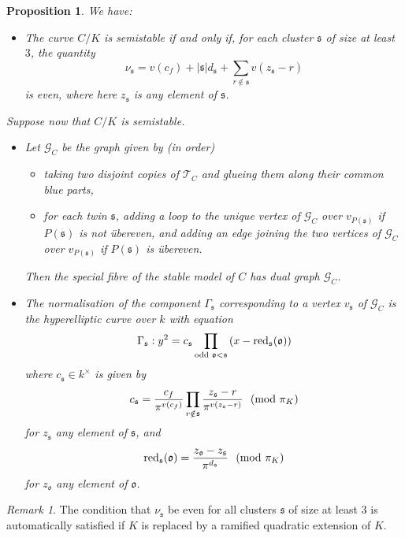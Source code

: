 \documentclass[12pt]{amsart}
\numberwithin{equation}{section}
\newtheorem{proposition}[equation]{Proposition}
\theoremstyle{remark}
\newtheorem{remark}[equation]{Remark}
\theoremstyle{definition}
\theoremstyle{definition}
\theoremstyle{definition}
\theoremstyle{definition}
\theoremstyle{definition}
\theoremstyle{definition}
\begin{document}
\begin{proposition} \label{m2d2}
We have:
\begin{itemize}
\item[(i)] The curve $C/K$ is semistable if and only if, for each cluster $\mathfrak{s}$ of size at least $3$, the quantity
\[\nu_{\mathfrak{s}}=v(c_f)+|\mathfrak{s}|d_{\mathfrak{s}}+\sum_{r\notin \mathfrak{s}}v(z_{\mathfrak{s}}-r)\]
is even, where here $z_{\mathfrak{s}}$ is any element of $\mathfrak{s}$.
\end{itemize}
 Suppose now that $C/K$ is semistable.
 \begin{itemize}
\item[(ii)] Let $\mathcal{G}_C$ be the graph given by (in order)
\begin{itemize}
\item taking two disjoint copies of $\mathcal{T}_C$ and glueing them along their common blue parts,
\item for each twin $\mathfrak{s}$, adding a loop to the unique vertex of $\mathcal{G}_C$ over $v_{P(\mathfrak{s})}$ if $P(\mathfrak{s})$ is not   \"{u}bereven, and adding an edge joining the two vertices of $\mathcal{G}_C$ over $v_{P(\mathfrak{s})}$ if $P(\mathfrak{s})$ is \"{u}bereven. 
\end{itemize}
Then the special fibre of the stable model of $C$ has dual graph $\mathcal{G}_C$. 
\item[(iii)] The normalisation of the component $\Gamma_{\mathfrak{s}}$ corresponding to a vertex $v_\mathfrak{s}$ of $\mathcal{G}_C$ is the hyperelliptic curve over $k$ with equation
\[\Gamma_\mathfrak{s}:y^2=c_\mathfrak{s}\prod_{\textup{odd }\mathfrak{o}<\mathfrak{s}}\left(x-\textup{red}_{\mathfrak{s}}(\mathfrak{o})\right)\]
where $c_\mathfrak{s}\in k^\times$ is given by
\[c_\mathfrak{s}=\frac{c_f}{\pi^{v(c_f)}}\prod_{r\notin \mathfrak{s}}\frac{z_\mathfrak{s}-r}{\pi^{v(z_\mathfrak{s}-r)}}~~(\textup{mod }\pi_K)\]
for $z_\mathfrak{s}$ any element of $\mathfrak{s}$, and
 \[\textup{red}_{\mathfrak{s}}(\mathfrak{o})=\frac{z_\mathfrak{o}-z_\mathfrak{s}}{\pi^{d_\mathfrak{s}}}~~(\textup{mod }\pi_K)\]
 for $z_\mathfrak{o}$ any element of $\mathfrak{o}$.
 \end{itemize}
\end{proposition}

\begin{remark}
The condition that $\nu_\mathfrak{s}$ be even for all clusters $\mathfrak{s}$ of size at least $3$ is automatically satisfied if $K$ is replaced by a ramified quadratic extension of $K$.
\end{remark}
\end{document}
